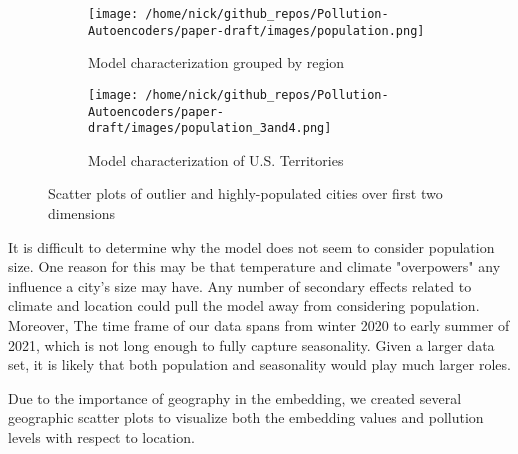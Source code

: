 \documentclass{article}
\begin{document}
\begin{figure}[h!]
\begin{subfigure}{0.5\textwidth}
    \texttt{[image: /home/nick/github\_repos/Pollution-Autoencoders/paper-draft/images/population.png]} 
    \caption{Model characterization grouped by region}
\end{subfigure}
\begin{subfigure}{0.5\textwidth}
    \texttt{[image: /home/nick/github\_repos/Pollution-Autoencoders/paper-draft/images/population\_3and4.png]}
    \caption{Model characterization of U.S. Territories}
\end{subfigure}
\caption{Scatter plots of outlier and highly-populated cities over first two dimensions}
\label{fig:population_comparison}
\end{figure}

\par It is difficult to determine why the model does not seem to consider population size. One reason for this may be that temperature and climate "overpowers" any influence a city's size may have. Any number of secondary effects related to climate and location could pull the model away from considering population. Moreover, The time frame of our data spans from winter 2020 to early summer of 2021, which is not long enough to fully capture seasonality. Given a larger data set, it is likely that both population and seasonality would play much larger roles.

\par Due to the importance of geography in the embedding, we created several geographic scatter plots to visualize both the embedding values and pollution levels with respect to location.
\end{document}
